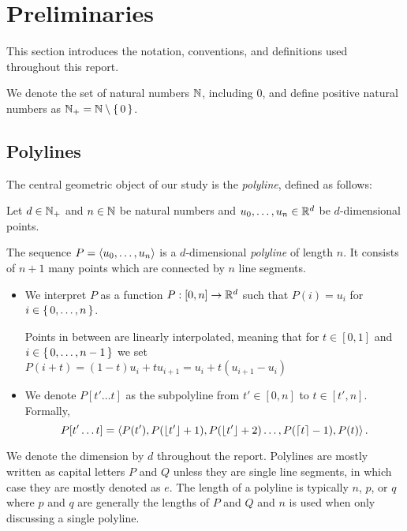\section{Preliminaries}
\label{sec:preliminaries}

This section introduces the notation, conventions, and definitions used throughout this report.  

We denote the set of natural numbers \(\mathbb{N}\), including \(0\), and define positive natural numbers as \(\mathbb{N}_+ = \mathbb{N} \setminus\set{0}\).

\subsection{Polylines}
\label{ssec:polylines}

The central geometric object of our study is the \emph{polyline}, defined as follows:

\begin{definition}[Polyline]
  Let \(d\in \mathbb{N}_+\) and \(n \in \mathbb{N}\) be natural numbers and \(u_0, \dots, u_n \in \mathbb{R}^d\) be \(d\)-dimensional points. 

  The sequence \(P = \left\langle u_0, \dots, u_n\right\rangle\) is a \(d\)-dimensional \emph{polyline} of length \(n\). It consists of \(n+1\) many points which are connected by \(n\) line segments. 
  \begin{itemize}
    \item We interpret \(P\) as a function \(P:[0,n] \to \mathbb{R}^d\) such that \(P(i) = u_i\) for \(i \in \set{0, \dots, n}\).

      Points in between are linearly interpolated, meaning that for \(t \in [0, 1]\) and \(i \in \set{0, \dots, n - 1}\) we set \(P(i + t) = (1- t)u_i + t u_{i+1} = u_i + t(u_{i+1} - u_i)\)
    \item We denote \(P[t'\dots t]\) as the subpolyline from \(t' \in [0, n]\) to \(t \in [t', n]\). Formally, \[P[t'\dots t] = \left\langle P(t'), P(\left\lfloor t'\right\rfloor + 1),  P(\left\lfloor t'\right\rfloor + 2) \dots, P(\left\lceil t\right\rceil - 1), P(t)\right\rangle.\]
  \end{itemize}

\end{definition}
We denote the dimension by \(d\) throughout the report. Polylines are mostly written as capital letters \(P\) and \(Q\) unless they are single line segments, in which case they are mostly denoted as \(e\). The length of a polyline is typically \(n\), \(p\), or \(q\) where \(p\) and \(q\) are generally the lengths of \(P\) and \(Q\) and \(n\) is used when only discussing a single polyline.


